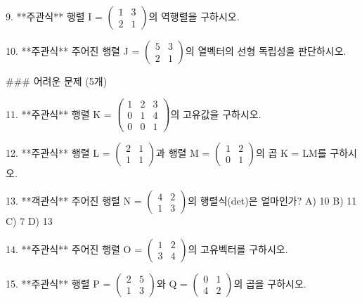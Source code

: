 9. **주관식**  
   행렬 I = \(\begin{pmatrix} 1 & 3 \\ 2 & 1 \end{pmatrix}\)의 역행렬을 구하시오.  

10. **주관식**  
   주어진 행렬 J = \(\begin{pmatrix} 5 & 3 \\ 2 & 1 \end{pmatrix}\)의 열벡터의 선형 독립성을 판단하시오.  

### 어려운 문제 (5개)

11. **주관식**  
    행렬 K = \(\begin{pmatrix} 1 & 2 & 3 \\ 0 & 1 & 4 \\ 0 & 0 & 1 \end{pmatrix}\)의 고유값을 구하시오.  

12. **주관식**  
    행렬 L = \(\begin{pmatrix} 2 & 1 \\ 1 & 1 \end{pmatrix}\)과 행렬 M = \(\begin{pmatrix} 1 & 2 \\ 0 & 1 \end{pmatrix}\)의 곱 K = LM를 구하시오.  

13. **객관식**  
    주어진 행렬 N = \(\begin{pmatrix} 4 & 2 \\ 1 & 3 \end{pmatrix}\)의 행렬식(det)은 얼마인가?  
    A) 10  
    B) 11  
    C) 7  
    D) 13  

14. **주관식**  
    주어진 행렬 O = \(\begin{pmatrix} 1 & 2 \\ 3 & 4 \end{pmatrix}\)의 고유벡터를 구하시오.  

15. **주관식**  
    행렬 P = \(\begin{pmatrix} 2 & 5 \\ 1 & 3 \end{pmatrix}\)와 Q = \(\begin{pmatrix} 0 & 1 \\ 4 & 2 \end{pmatrix}\)의 곱을 구하시오.  


